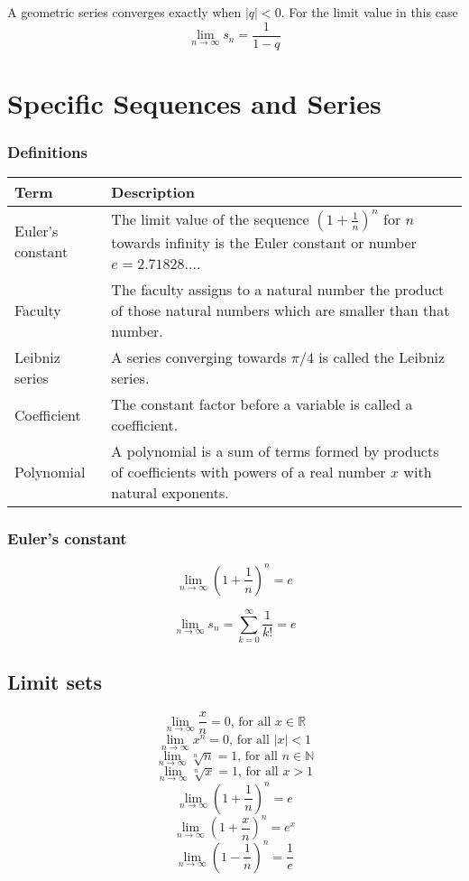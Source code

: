 \documentclass{book}
\begin{document}
A geometric series converges exactly when $|q|<0$. For the limit value in this case
\[
  \lim\limits_{n\to\infty}s_{n} = \frac{1}{1-q}
\]

\section{Specific Sequences and Series}
\subsubsection{Definitions}
\begin{tabular}{p{3cm}p{10.5cm}}
  \toprule
  \textbf{Term} & \textbf{Description} \\
  \midrule
  Euler's constant & The limit value of the sequence $\left(1+\frac{1}{n}\right)^{n}$ for $n$ towards infinity is the Euler constant or number $e = 2.71828...$.\\
  \midrule
  Faculty & The faculty assigns to a natural number the product of those natural numbers which are smaller than that number.\\
  \midrule
  Leibniz series & A series converging towards $\pi/4$ is called the Leibniz series.\\
  \midrule
  Coefficient & The constant factor before a variable is called a coefficient.\\
  \midrule
  Polynomial & A polynomial is a sum of terms formed by products of coefficients with powers of a real number $x$ with natural exponents.\\ 
  \bottomrule
\end{tabular}

\subsubsection{Euler's constant}
\[
  \lim\limits_{n\to\infty}\left(1+\frac{1}{n}\right)^{n}=e
\]

\[
  \lim\limits_{n\to\infty}s_{n}=\sum_{k=0}^{\infty}\frac{1}{k!}=e
\]

\subsection{Limit sets}
\[
  \lim\limits_{n\to \infty} \frac{x}{n}=0\text{, for all }x\in\mathbb{R}
\]
\[
  \lim\limits_{n\to \infty} x^n=0\text{, for all }|x|<1
\]
\[
  \lim\limits_{n\to \infty} \sqrt[n]{n}=1\text{, for all }n\in\mathbb{N}
\]
\[
  \lim\limits_{n\to \infty} \sqrt[n]{x}=1\text{, for all }x>1
\]
\[
  \lim\limits_{n\to \infty} \left(1+\frac{1}{n}\right)^n=e
\]
\[
  \lim\limits_{n\to \infty} \left(1+\frac{x}{n}\right)^n=e^x
\]
\[
  \lim\limits_{n\to \infty} \left(1-\frac{1}{n}\right)^n=\frac{1}{e}
\]
\end{document}
